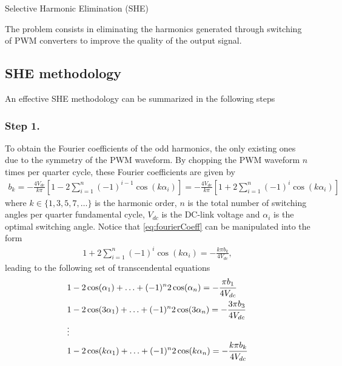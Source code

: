 \documentclass[a4paper]{report}
\begin{document}
\begin{center}
\Large{Selective Harmonic Elimination (SHE)} 
\end{center}

The problem consists in eliminating the harmonics generated through switching of PWM converters to improve the quality of the output signal. 

\subsection*{SHE methodology}

An effective SHE methodology can be summarized in the following steps

\subsubsection*{Step 1.} To obtain the Fourier coefficients of the odd harmonics, the only existing ones due to the symmetry of the PWM waveform. By chopping the PWM waveform $n$ times per quarter cycle, these Fourier coefficients are given by
\begin{align}\label{eq:fourierCoeff}
	b_k = -\frac{4V_{dc}}{k\pi}\left[1-2\sum_{i=1}^n(-1)^{i-1}\cos(k\alpha_i)\right] = -\frac{4V_{dc}}{k\pi}\left[1+2\sum_{i=1}^n(-1)^i\cos(k\alpha_i)\right]
\end{align}
where $k\in\{1,3,5,7,\ldots\}$ is the harmonic order, $n$ is the total number of switching angles per quarter fundamental cycle, $V_{dc}$ is the DC-link voltage and $\alpha_i$ is the optimal switching angle. Notice that \eqref{eq:fourierCoeff} can be manipulated into the form
\begin{align*}
	1+2\sum_{i=1}^n(-1)^i\cos(k\alpha_i) = -\frac{k\pi b_k}{4V_{dc}},
\end{align*}
leading to the following set of transcendental equations
\begin{align}\label{eq:transcEq}
	&1-2\cos(\alpha_1) + \ldots + (-1)^n2\cos(\alpha_n)= -\frac{\pi b_1}{4V_{dc}}\notag 
	\\
	&1-2\cos(3\alpha_1) + \ldots + (-1)^n2\cos(3\alpha_n)= -\frac{3\pi b_3}{4V_{dc}}\notag 
	\\
	&\vdots \notag 
	\\
	&1-2\cos(k\alpha_1) + \ldots + (-1)^n2\cos(k\alpha_n)= -\frac{k\pi b_k}{4V_{dc}}
\end{align}
	
\end{document}

